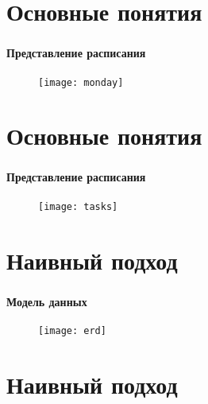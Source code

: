 
\section{Основные понятия}

\begin{frame}
\frametitle{\insertsection}
\framesubtitle{Представление расписания}

\begin{figure}
    \center
    \texttt{[image: monday]}
\end{figure}
\end{frame}


\section{Основные понятия}

\begin{frame}
\frametitle{\insertsection}
\framesubtitle{Представление расписания}

\begin{figure}
    \center
    \texttt{[image: tasks]}
\end{figure}
\end{frame}


\section{Наивный подход}

\begin{frame}
\frametitle{\insertsection}
\framesubtitle{Модель данных}

\begin{figure}
    \center
    \texttt{[image: erd]}
\end{figure}
\end{frame}


\section{Наивный подход}

